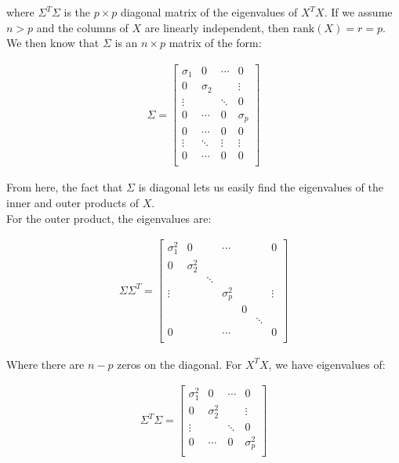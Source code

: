 \documentclass[a4paper]{article}
\begin{document}
where $\Sigma^T\Sigma$ is the $p \times p$ diagonal matrix of the
eigenvalues of $X^TX$.  If we assume $n > p$ and the columns of 
$X$ are linearly independent, then $\text{rank}\left(X\right) = r = p$.
We then know that $\Sigma$ is an $n \times p$ matrix of the form:

\begin{align*}
\Sigma = 
  \begin{bmatrix}
    \sigma_1 & 0 & \cdots & 0 \\
    0 & \sigma_2  &  &  \vdots \\
    \vdots  & & \ddots  &  0 \\
    0 & \cdots & 0 & \sigma_p\\
    0 & \cdots  & 0 & 0\\
    \vdots & \ddots & \vdots & \vdots \\
    0 & \cdots & 0 & 0 \\
  \end{bmatrix}
\end{align*}

From here, the fact that $\Sigma$ is diagonal lets us easily find the
eigenvalues of the inner and outer products of $X$.\\  

For the outer product, the eigenvalues are:

\begin{align*}
\Sigma\Sigma^T = 
  \begin{bmatrix}
    \sigma_1^2 & 0 & & \cdots & & & 0 \\
    0 & \sigma_2^2 & & & & \\
    & & \ddots & & & & \\
    \vdots & & & \sigma_p^2 & & & \vdots \\
    & & & & 0 & & \\
    & & & & & \ddots & \\
    0 & & & \cdots & & & 0 \\
  \end{bmatrix}
\end{align*}

Where there are $n-p$ zeros on the diagonal.  For $X^TX$, we have
eigenvalues of:

\begin{align*}
\Sigma^T\Sigma =
  \begin{bmatrix}
    \sigma_1^2 & 0 & \cdots & 0\\
    0 & \sigma_2^2 & & \vdots \\
    \vdots & & \ddots & 0 \\
    0 & \cdots & 0 & \sigma_p^2 \\
  \end{bmatrix}
\end{align*}
\end{document}
